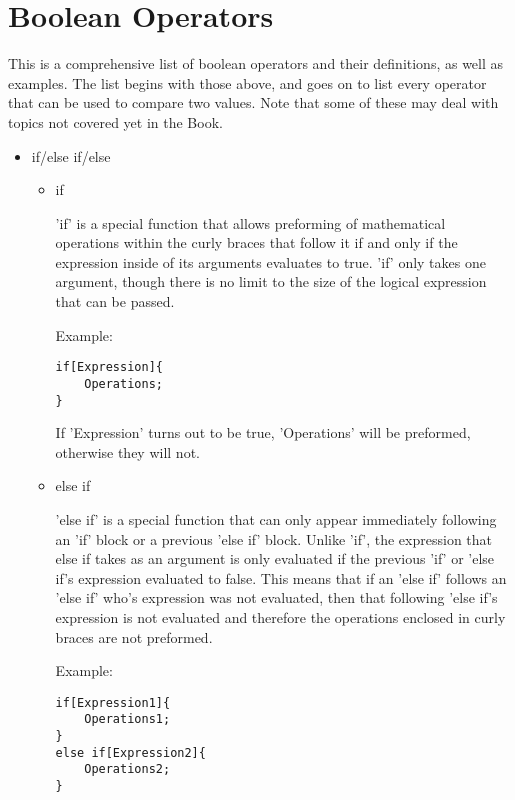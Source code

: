 \section{Boolean Operators}
This is a comprehensive list of boolean operators and their definitions, as well as examples. The list begins with those above, and goes on to list every operator that can be used to compare two values. Note that some of these may deal with topics not covered yet in the Book. \\
\begin{itemize}
\item if/else if/else \\
\begin{itemize}
\item if\\
\begin{center}
'if' is a special function that allows preforming of mathematical operations within the curly braces that follow it if and only if the expression inside of its arguments evaluates to true. 'if' only takes one argument, though there is no limit to the size of the logical expression that can be passed. \\
\end{center}
Example:\\
\begin{verbatim}
if[Expression]{
	Operations;
}
\end{verbatim}
\begin{center}
If 'Expression' turns out to be true, 'Operations' will be preformed, otherwise they will not.
\end{center}
\item else if\\
\begin{center}
'else if' is a special function that can only appear immediately following an 'if' block or a previous 'else if' block. Unlike 'if', the expression that else if takes as an argument is only evaluated if the previous 'if' or 'else if's expression evaluated to false. This means that if an 'else if' follows an 'else if' who's expression was not evaluated, then that following 'else if's expression is not evaluated and therefore the operations enclosed in curly braces are not preformed.
\end{center}
Example:\\
\begin{verbatim}
if[Expression1]{
	Operations1;
}
else if[Expression2]{
	Operations2;
}
\end{verbatim}
\begin{center}

\end{center}
\end{itemize}
\end{itemize}
